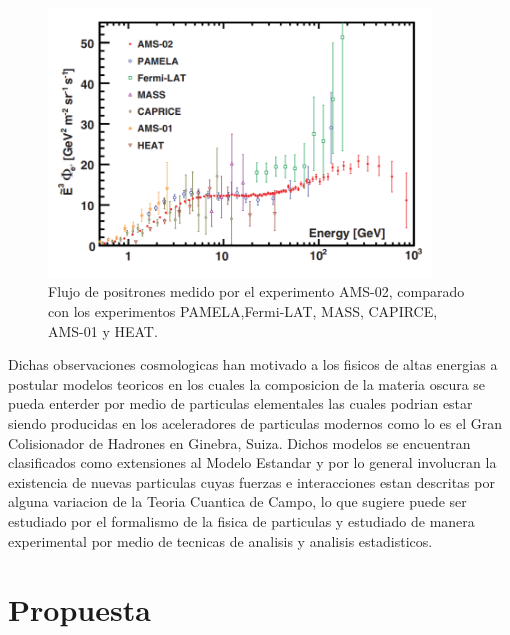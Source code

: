 \begin{figure}
\begin{center}
  \includegraphics[width=4.0in]{AMS_positronflux.png}
  \caption{Flujo de positrones medido por el experimento AMS-02, comparado con los experimentos PAMELA,Fermi-LAT, MASS, CAPIRCE, AMS-01 y HEAT.}
  \label{fig:AMS_positron}
\end{center}
\end{figure}

Dichas observaciones cosmologicas han motivado a los fisicos de 
altas energias a postular modelos teoricos en los cuales la composicion de la materia oscura se pueda enterder por medio de particulas elementales las cuales podrian estar siendo producidas en los aceleradores de particulas modernos como lo es el Gran Colisionador de Hadrones en Ginebra, Suiza.  Dichos modelos se encuentran clasificados como extensiones al Modelo Estandar y por lo general involucran la existencia de nuevas particulas cuyas fuerzas e interacciones estan descritas por alguna variacion de la Teoria Cuantica de Campo, lo que sugiere puede ser estudiado por el formalismo de la fisica de particulas y estudiado de manera experimental por medio de tecnicas de analisis y analisis estadisticos. 

\chapter{Propuesta}

